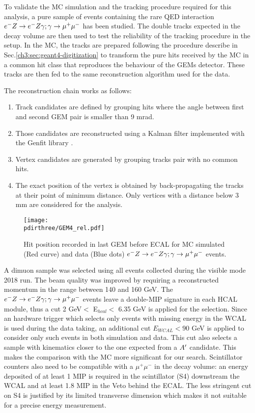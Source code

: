 To validate the MC simulation and the tracking procedure required for this analysis, a pure sample of events containing the rare QED interaction $\emu$ has been studied. The double tracks expected in the decay volume are then used to test the reliability of the tracking procedure in the setup. In the MC, the tracks are prepared following the procedure describe in Sec.\ref{ch3:sec:geant4-digitization} to transform the pure hits received by the MC in a common hit class that reproduces the behaviour of the GEMs detector. These tracks are then fed to the same reconstruction algorithm used for the data.

The reconstruction chain works as follows:
\begin{enumerate}
\item Track candidates are defined by grouping hits where the angle between first and second GEM pair is smaller than 9 mrad.
\item Those candidates are reconstructed using a Kalman filter implemented with the Genfit library \cite{genfit}.
\item Vertex candidates are generated by grouping tracks pair with no common hits.
\item The exact position of the vertex is obtained by back-propagating the tracks at their point of minimum distance. Only vertices with a distance below 3 mm are considered for the analysis.
\end{enumerate}

\begin{figure}[tbh!]
  \begin{center}
    \texttt{[image: \\pdirthree/GEM4\_rel.pdf]}
  \end{center}

  \caption[Hit position of $\emu$ in GEM MC-DATA]{Hit position recorded in last GEM before ECAL for MC simulated (Red curve) and data (Blue dots) $\emu$ events.}
  \label{fig:dimuon:gemspectra}
\end{figure}
  

A dimuon sample was selected using all events collected during the visible mode 2018 run. The beam quality was improved by requiring a reconstructed momentum in the range between 140 and 160 GeV. The $\emu$ events leave a double-MIP signature in each HCAL module, thus a cut 2 GeV$<$ E$_{hcal} <$ 6.35 GeV is applied for the selection. Since an hardware trigger which selects only events with missing energy in the WCAL is used during the data taking, an additional cut $E_{WCAL} < 90$ GeV is applied to consider only such events in both simulation and data. This cut also selects a sample with kinematics closer to the one expected from a $A'$ candidate. This makes the comparison with the MC more significant for our search. Scintillator counters also need to be compatible with a $\mu^+ \mu^-$ in the decay volume: an energy deposited of at least 1 MIP is required in the scintillator (S4) downstream the WCAL and at least 1.8 MIP in the Veto behind the ECAL. The less stringent cut on S4 is justified by its limited transverse dimension which makes it not suitable for a precise energy measurement.

